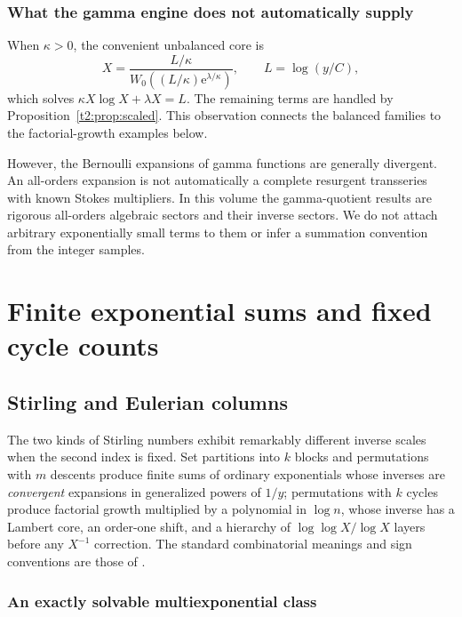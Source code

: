 \documentclass[11pt,openany]{book}
\numberwithin{equation}{chapter}
\theoremstyle{plain}
\theoremstyle{definition}
\theoremstyle{remark}
\newcommand{\ee}{\mathrm e}
\begin{document}
\section{What the gamma engine does not automatically supply}

When $\kappa>0$, the convenient unbalanced core is
\begin{equation}
 X=\frac{L/\kappa}{W_0\!\left((L/\kappa)\ee^{\lambda/\kappa}\right)},
 \qquad L=\log(y/C),
 \label{t2:eq:unbalanced-core}
\end{equation}
which solves $\kappa X\log X+\lambda X=L$. The remaining terms are handled by Proposition~\ref{t2:prop:scaled}. This observation connects the balanced families to the factorial-growth examples below.

However, the Bernoulli expansions of gamma functions are generally divergent. An all-orders expansion is not automatically a complete resurgent transseries with known Stokes multipliers. In this volume the gamma-quotient results are rigorous all-orders algebraic sectors and their inverse sectors. We do not attach arbitrary exponentially small terms to them or infer a summation convention from the integer samples.

\part{Finite exponential sums and fixed cycle counts}
\label{ct:part:finite}

\chapter{Stirling and Eulerian columns}
\label{ct:ch:columns}

The two kinds of Stirling numbers exhibit remarkably different inverse
scales when the second index is fixed.  Set partitions into $k$ blocks and
permutations with $m$ descents produce finite sums of ordinary exponentials
whose inverses are \emph{convergent} expansions in generalized powers of
$1/y$; permutations with $k$ cycles produce factorial growth multiplied by a
polynomial in $\log n$, whose inverse has a Lambert core, an order-one
shift, and a hierarchy of $\log\log X/\log X$ layers before any $X^{-1}$
correction.  The standard combinatorial meanings and sign conventions are
those of \cite{dlmfstirling,wlstirling2,wlstirling1}.

\section{An exactly solvable multiexponential class}
\end{document}
